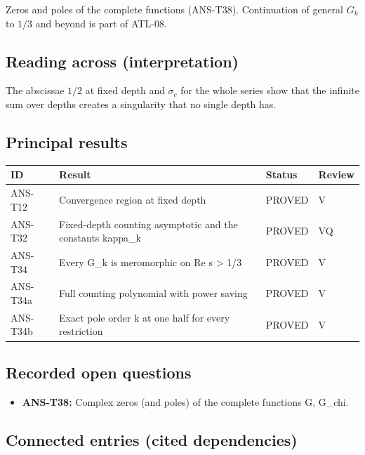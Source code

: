 \documentclass[
  11pt,
]{article}
\providecommand{\tightlist}{%
  \setlength{\itemsep}{0pt}\setlength{\parskip}{0pt}}
\begin{document}
Zeros and poles of the complete functions (ANS-T38). Continuation of
general \(G_k\) to \(1/3\) and beyond is part of ATL-08.

\hypertarget{reading-across-interpretation-5}{%
\subsection{Reading across
(interpretation)}\label{reading-across-interpretation-5}}

The abscissae \(1/2\) at fixed depth and \(\sigma_c\) for the whole
series show that the infinite sum over depths creates a singularity that
no single depth has.

\hypertarget{principal-results-5}{%
\subsection{Principal results}\label{principal-results-5}}

\begin{longtable}[]{@{}llll@{}}
\toprule
ID & Result & Status & Review\tabularnewline
\midrule
\endhead
ANS-T12 & Convergence region at fixed depth & PROVED & V\tabularnewline
ANS-T32 & Fixed-depth counting asymptotic and the constants kappa\_k &
PROVED & VQ\tabularnewline
ANS-T34 & Every G\_k is meromorphic on Re s \textgreater{} 1/3 & PROVED
& V\tabularnewline
ANS-T34a & Full counting polynomial with power saving & PROVED &
V\tabularnewline
ANS-T34b & Exact pole order k at one half for every restriction & PROVED
& V\tabularnewline
\bottomrule
\end{longtable}

\hypertarget{recorded-open-questions-4}{%
\subsection{Recorded open questions}\label{recorded-open-questions-4}}

\begin{itemize}
\tightlist
\item
  \textbf{ANS-T38:} Complex zeros (and poles) of the complete functions
  G, G\_chi.
\end{itemize}

\hypertarget{connected-entries-cited-dependencies-5}{%
\subsection{Connected entries (cited
dependencies)}\label{connected-entries-cited-dependencies-5}}
\end{document}
